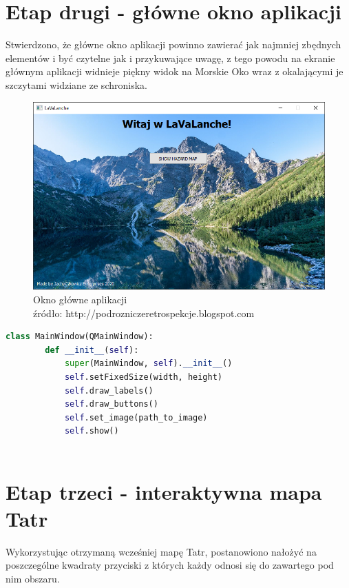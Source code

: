 \section{Etap drugi - główne okno aplikacji}
Stwierdzono, że główne okno aplikacji powinno zawierać jak najmniej zbędnych elementów i być czytelne jak i przykuwające uwagę, z tego powodu na ekranie głównym aplikacji widnieje piękny widok na Morskie Oko wraz z okalającymi je szczytami widziane ze schroniska.
\begingroup
\begin{figure}[h]
	\centering
	\includegraphics[scale=0.6]{main_window.png}
	\caption{Okno główne aplikacji \\ źródło: http://podrozniczeretrospekcje.blogspot.com}
\end{figure}
\endgroup

\begin{lstlisting}[language=Python,caption=Fragment pseudokodu realizującego okno główne]
	class MainWindow(QMainWindow):
		def __init__(self):
			super(MainWindow, self).__init__()
			self.setFixedSize(width, height)
			self.draw_labels()
			self.draw_buttons()
			self.set_image(path_to_image)
			self.show()
	
\end{lstlisting}

\clearpage
\section{Etap trzeci - interaktywna mapa Tatr}
Wykorzystując otrzymaną wcześniej mapę Tatr, postanowiono nałożyć na poszczególne kwadraty przyciski z których każdy odnosi się do zawartego pod nim obszaru. 

